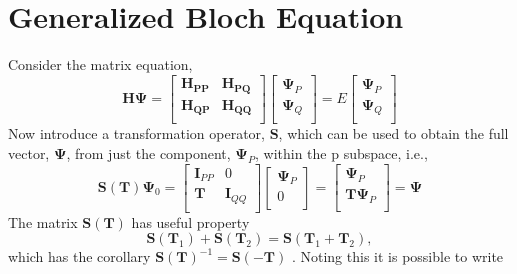 \section{ Generalized Bloch Equation } 
Consider the matrix equation,
\begin{equation}
\mathbf{H}\boldsymbol{\Psi} =
\begin{bmatrix}
 \mathbf{H_{PP}} & \mathbf{H_{PQ}} \\ 
 \mathbf{H_{QP}} & \mathbf{H_{QQ}} \\ 
\end{bmatrix} 
\begin{bmatrix}
 \boldsymbol{\Psi}_{P} \\ 
 \boldsymbol{\Psi}_{Q} \\ 
\end{bmatrix} 
= E 
\begin{bmatrix}
 \boldsymbol{\Psi}_{P} \\ 
 \boldsymbol{\Psi}_{Q} \\ 
\end{bmatrix} 
\end{equation}
Now introduce a transformation operator, $\mathbf{S}$, which can be used to obtain the full 
vector, $\boldsymbol{\Psi}$, from just the component, $\boldsymbol{\Psi}_{P}$, within the $\mathrm{p}$ subspace, i.e.,
\begin{equation}
\mathbf{S}(\mathbf{T})\boldsymbol{\Psi}_{0}= 
\begin{bmatrix}
\mathbf{I}_{PP} & 0 \\ 
\mathbf{T} & \mathbf{I}_{QQ} \\ 
\end{bmatrix}
\begin{bmatrix}
\boldsymbol{\Psi}_{P} \\ 
0 \\ 
\end{bmatrix}=  
\begin{bmatrix}
\boldsymbol{\Psi}_{P} \\ 
\mathbf{T}\boldsymbol{\Psi}_{P} \\ 
\end{bmatrix} 
= \boldsymbol{\Psi}
\end{equation}
The matrix $\mathbf{S}(\mathbf{T})$ has useful property
\begin{equation}
\mathbf{S}(\mathbf{T}_{1})+ \mathbf{S}(\mathbf{T}_{2})=\mathbf{S}(\mathbf{T}_{1}+\mathbf{T}_{2}),
\end{equation}
which has the corollary  $\mathbf{S}(\mathbf{T})^{-1}=\mathbf{S}(-\mathbf{T})$ . Noting this it is possible to write
